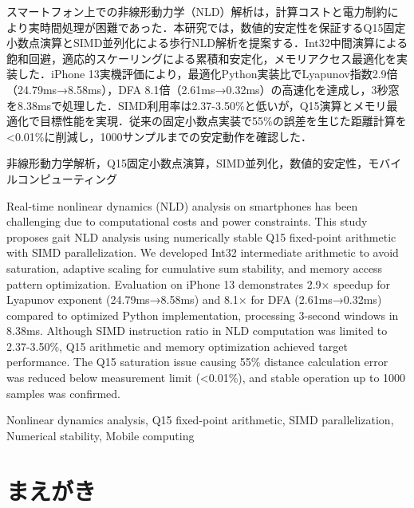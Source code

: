 \documentclass[paper]{ieice}
\begin{document}
\begin{jabstract}
スマートフォン上での非線形動力学（NLD）解析は，計算コストと電力制約により実時間処理が困難であった．本研究では，数値的安定性を保証するQ15固定小数点演算とSIMD並列化による歩行NLD解析を提案する．Int32中間演算による飽和回避，適応的スケーリングによる累積和安定化，メモリアクセス最適化を実装した．iPhone 13実機評価により，最適化Python実装比でLyapunov指数2.9倍（24.79ms→8.58ms），DFA 8.1倍（2.61ms→0.32ms）の高速化を達成し，3秒窓を8.38msで処理した．SIMD利用率は2.37-3.50\%と低いが，Q15演算とメモリ最適化で目標性能を実現．従来の固定小数点実装で55\%の誤差を生じた距離計算を<0.01\%に削減し，1000サンプルまでの安定動作を確認した．
\end{jabstract}

\begin{jkeyword}
非線形動力学解析，Q15固定小数点演算，SIMD並列化，数値的安定性，モバイルコンピューティング
\end{jkeyword}

\begin{eabstract}
Real-time nonlinear dynamics (NLD) analysis on smartphones has been challenging due to computational costs and power constraints. This study proposes gait NLD analysis using numerically stable Q15 fixed-point arithmetic with SIMD parallelization. We developed Int32 intermediate arithmetic to avoid saturation, adaptive scaling for cumulative sum stability, and memory access pattern optimization. Evaluation on iPhone 13 demonstrates 2.9× speedup for Lyapunov exponent (24.79ms→8.58ms) and 8.1× for DFA (2.61ms→0.32ms) compared to optimized Python implementation, processing 3-second windows in 8.38ms. Although SIMD instruction ratio in NLD computation was limited to 2.37-3.50\%, Q15 arithmetic and memory optimization achieved target performance. The Q15 saturation issue causing 55\% distance calculation error was reduced below measurement limit (<0.01\%), and stable operation up to 1000 samples was confirmed.
\end{eabstract}

\begin{ekeyword}
Nonlinear dynamics analysis, Q15 fixed-point arithmetic, SIMD parallelization, Numerical stability, Mobile computing
\end{ekeyword}

\maketitle

\section{まえがき}
\end{document}

